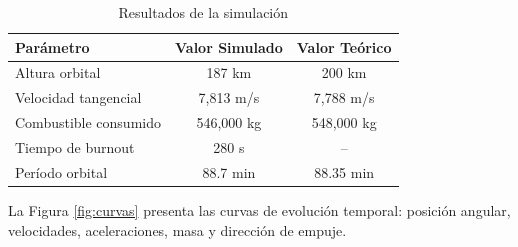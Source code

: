 \documentclass[10pt,a4paper]{article}
\begin{document}
\begin{table}[H]
\centering
\caption{Resultados de la simulación}
\label{tab:resultados}
\begin{tabular}{@{}lcc@{}}
\toprule
\textbf{Parámetro} & \textbf{Valor Simulado} & \textbf{Valor Teórico} \\
\midrule
Altura orbital & 187 km & 200 km \\
Velocidad tangencial & 7,813 m/s & 7,788 m/s \\
Combustible consumido & 546,000 kg & 548,000 kg \\
Tiempo de burnout & 280 s & -- \\
Período orbital & 88.7 min & 88.35 min \\
\bottomrule
\end{tabular}
\end{table}

La Figura \ref{fig:curvas} presenta las curvas de evolución temporal: posición angular, velocidades, aceleraciones, masa y dirección de empuje.
\end{document}
